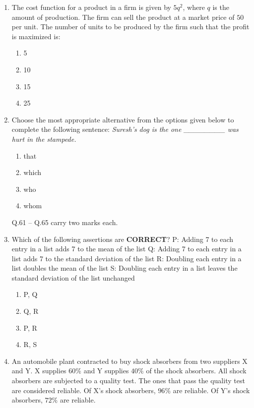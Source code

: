 \documentclass[journal,12pt,onecolumn]{IEEEtran}
\theoremstyle{remark}
\begin{document}
\begin{enumerate}
\item The cost function for a product in a firm is given by $ 5q^2 $, where $q$ is the amount of production. The firm can sell the product at a market price of  $50$ per unit. The number of units to be produced by the firm such that the profit is maximized is:
\begin{multicols}{4}
\begin{enumerate}
    \item 5
    \item 10
    \item 15
    \item 25
\end{enumerate}
\end{multicols}

\item Choose the most appropriate alternative from the options given below to complete the following sentence: 
\textit{Suresh's dog is the one \_\_\_\_\_\_\_\_ was hurt in the stampede.}
\begin{multicols}{2}
\begin{enumerate}[label=\Alph*)]
    \item that
    \item which
    \item who
    \item whom
\end{enumerate}
\end{multicols}

Q.61 -- Q.65 carry two marks each.

\item Which of the following assertions are \textbf{CORRECT}? 
P: Adding 7 to each entry in a list adds 7 to the mean of the list 
Q: Adding 7 to each entry in a list adds 7 to the standard deviation of the list 
R: Doubling each entry in a list doubles the mean of the list 
S: Doubling each entry in a list leaves the standard deviation of the list unchanged
\begin{multicols}{4}
\begin{enumerate}
    \item P, Q
    \item Q, R
    \item P, R
    \item R, S
\end{enumerate}
\end{multicols}
\item An automobile plant contracted to buy shock absorbers from two suppliers X and Y. X supplies $60\%$ and Y supplies $40\%$ of the shock absorbers. All shock absorbers are subjected to a quality test. The ones that pass the quality test are considered reliable. Of X's shock absorbers, $96\%$ are reliable. Of Y's shock absorbers, $72\%$ are reliable. \\


\end{enumerate}
\end{document}
